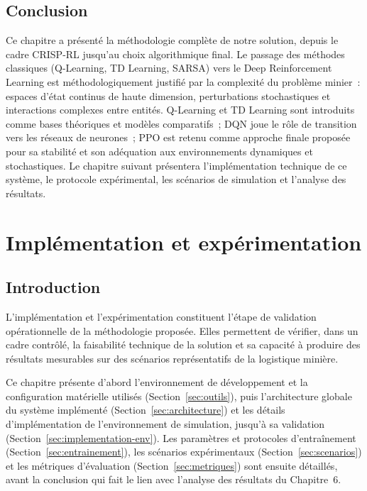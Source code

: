 \documentclass[11pt,a4paper]{report}
\begin{document}
\section{Conclusion}
\label{sec:conclusion-methodologie}
Ce chapitre a présenté la méthodologie complète de notre solution, depuis le cadre CRISP-RL jusqu'au choix algorithmique final. Le passage des méthodes classiques (Q-Learning, TD Learning, SARSA) vers le Deep Reinforcement Learning est méthodologiquement justifié par la complexité du problème minier~: espaces d'état continus de haute dimension, perturbations stochastiques et interactions complexes entre entités. Q-Learning et TD Learning sont introduits comme bases théoriques et modèles comparatifs~; DQN joue le rôle de transition vers les réseaux de neurones~; PPO est retenu comme approche finale proposée pour sa stabilité et son adéquation aux environnements dynamiques et stochastiques. Le chapitre suivant présentera l'implémentation technique de ce système, le protocole expérimental, les scénarios de simulation et l'analyse des résultats.

\chapter{Implémentation et expérimentation}
\label{chap:implementation}

\section*{Introduction}

L'implémentation et l'expérimentation constituent l'étape de validation opérationnelle de la méthodologie proposée. Elles permettent de vérifier, dans un cadre contrôlé, la faisabilité technique de la solution et sa capacité à produire des résultats mesurables sur des scénarios représentatifs de la logistique minière.

Ce chapitre présente d'abord l'environnement de développement et la configuration matérielle utilisés (Section~\ref{sec:outils}), puis l'architecture globale du système implémenté (Section~\ref{sec:architecture}) et les détails d'implémentation de l'environnement de simulation, jusqu'à sa validation (Section~\ref{sec:implementation-env}). Les paramètres et protocoles d'entraînement (Section~\ref{sec:entrainement}), les scénarios expérimentaux (Section~\ref{sec:scenarios}) et les métriques d'évaluation (Section~\ref{sec:metriques}) sont ensuite détaillés, avant la conclusion qui fait le lien avec l'analyse des résultats du Chapitre~6.
\end{document}
